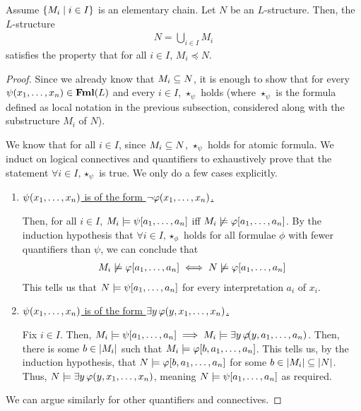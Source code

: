 \begin{boxtheorem}
    Assume $\left\{ M_i \; \middle\vert \; i \in I \right\}$ is an elementary chain. Let $N$ be an $L$-structure. Then, the $L$-structure
    \begin{align*}
        N = \bigcup_{i \in I} M_i
    \end{align*}
    satisfies the property that for all $i \in I$, $M_i \preceq N$.
\end{boxtheorem}
\begin{proof}
    Since we already know that $M_i \subseteq N$, it is enough to show that for every $\psi\!\left( x_1, \ldots, x_n \right) \in \mathbf{Fml}(L)$ and every $i \in I$, $\star_{\psi}$ holds (where $\star_{\psi}$ is the formula defined as local notation in the previous subsection, considered along with the substructure $M_i$ of $N$).

    We know that for all $i \in I$, since $M_i \subseteq N$, $\star_{\psi}$ holds for atomic formula. We induct on logical connectives and quantifiers to exhaustively prove that the statement $\forall i \in I, \star_{\psi}$ is true. We only do a few cases explicitly.

    \begin{enumerate}
        \item \underline{$\psi\!\left( x_1, \ldots, x_n \right)$ is of the form $\neg \varphi\!\left( x_1, \ldots, x_n \right)$.}

        Then, for all $i \in I$, $M_i \models \psi\!\left[ a_1, \ldots, a_n \right]$ iff $M_i \not\models \varphi\!\left[ a_1, \ldots, a_n \right]$. By the induction hypothesis that $\forall i \in I, \star_{\phi}$ holds for all formulae $\phi$ with fewer quantifiers than $\psi$, we can conclude that
        \begin{align*}
            M_i \not\models \varphi\!\left[ a_1, \ldots, a_n \right]
            \iff
            N \not\models \varphi\!\left[ a_1, \ldots, a_n \right]
        \end{align*}
        This tells us that $N \models \psi\!\left[ a_1, \ldots, a_n \right]$ for every interpretation $a_i$ of $x_i$.

        \item \underline{$\psi\!\left( x_1, \ldots, x_n \right)$ is of the form $\exists y\,  \varphi\!\left( y, x_1, \ldots, x_n \right)$.}

        Fix $i \in I$. Then, $M_i \models \psi\!\left[ a_1, \ldots, a_n \right] \implies M_i \models \exists y \, \varphi\!\!\left( y, a_1, \ldots, a_n \right)$. Then, there is some $b \in \left\lvert M_i \right\rvert$ such that $M_i \models \varphi\!\left[ b, a_1, \ldots, a_n \right]$. This tells us, by the induction hypothesis, that $N \models \varphi\!\left[ b, a_1, \ldots, a_n \right]$ for some $b \in \left\lvert M_i \right\rvert \subseteq \left\lvert N \right\rvert$. Thus, $N \models \exists y\,  \varphi\!\left( y, x_1, \ldots, x_n \right)$, meaning $N \models \psi\!\left[ a_1, \ldots, a_n \right]$ as required.
    \end{enumerate}
    We can argue similarly for other quantifiers and connectives.
\end{proof}

